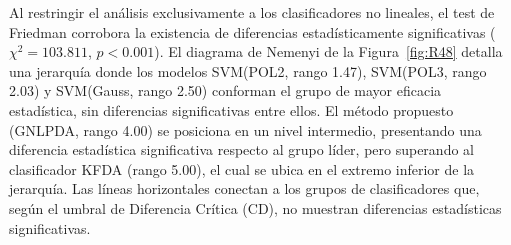 Al restringir el análisis exclusivamente a los clasificadores no lineales, el test de Friedman corrobora la existencia de diferencias estadísticamente significativas ($\chi^2=103.811$, $p<0.001$). 
El diagrama de Nemenyi de la Figura~\ref{fig:R48} detalla una jerarquía donde los modelos SVM(POL2, rango 1.47), SVM(POL3, rango 2.03) y SVM(Gauss, rango 2.50) conforman el grupo de mayor eficacia estadística, sin diferencias significativas entre ellos.
El método propuesto (GNLPDA, rango 4.00) se posiciona en un nivel intermedio, presentando una diferencia estadística significativa respecto al grupo líder, pero superando al clasificador KFDA (rango 5.00), el cual se ubica en el extremo inferior de la jerarquía. Las líneas horizontales conectan a los grupos de clasificadores que, según el umbral de Diferencia Crítica (CD), no muestran diferencias estadísticas significativas.

